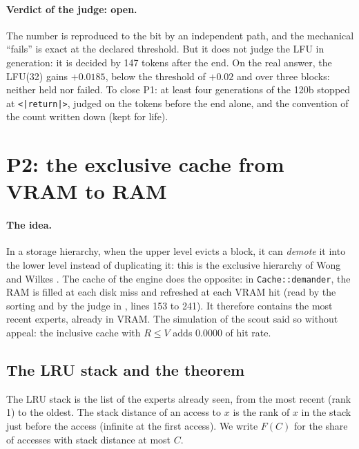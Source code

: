 \paragraph{Verdict of the judge: open.} The number is reproduced to the bit by an independent path, and the mechanical ``fails'' is exact at the declared threshold. But it does not judge the LFU in generation: it is decided by 147 tokens after the end. On the real answer, the LFU(32) gains $+0.0185$, below the threshold of $+0.02$ and over three blocks: neither held nor failed. To close P1: at least four generations of the 120b stopped at \texttt{<|return|>}, judged on the tokens before the end alone, and the convention of the count written down (kept for life).

\section{P2: the exclusive cache from VRAM to RAM}\label{t3mim:sec:p2}

\paragraph{The idea.} In a storage hierarchy, when the upper level evicts a block, it can \emph{demote} it into the lower level instead of duplicating it: this is the exclusive hierarchy of Wong and Wilkes \cite{wong2002exclusive}. The cache of the engine does the opposite: in \texttt{Cache::demander}, the RAM is filled at each disk miss and refreshed at each VRAM hit (read by the sorting and by the judge in , lines 153 to 241). It therefore contains the most recent experts, already in VRAM. The simulation of the scout said so without appeal: the inclusive cache with $R \le V$ adds 0.0000 of hit rate.

\subsection{The LRU stack and the theorem}\label{t3mim:sec:p2-theoreme}

\begin{definition}\label{t3mim:def:pile}
The LRU stack is the list of the experts already seen, from the most recent (rank 1) to the oldest. The stack distance of an access to $x$ is the rank of $x$ in the stack just before the access (infinite at the first access). We write $F(C)$ for the share of accesses with stack distance at most $C$.
\end{definition}

